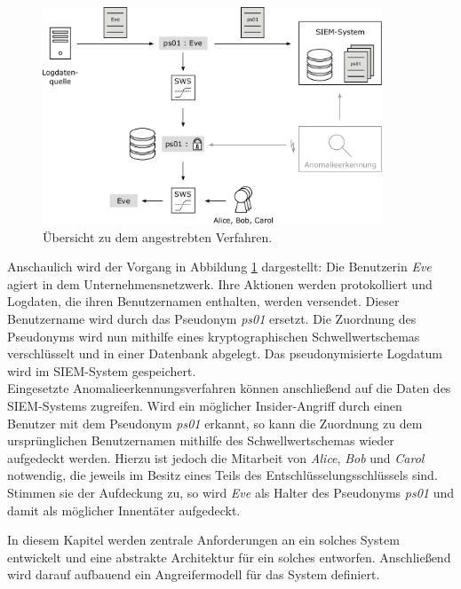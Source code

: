 \begin{figure}[]
    \centering
        \includegraphics[width=0.9\textwidth]{dia/overview.pdf}
    \caption{Übersicht zu dem angestrebten Verfahren.}
    \label{fig:overview_initial}
\end{figure}

Anschaulich wird der Vorgang in Abbildung \ref{fig:overview_initial} dargestellt: Die Benutzerin \textit{Eve} agiert in dem Unternehmensnetzwerk. Ihre Aktionen werden protokolliert und Logdaten, die ihren Benutzernamen enthalten, werden versendet. Dieser Benutzername wird durch das Pseudonym \textit{ps01} ersetzt. Die Zuordnung des Pseudonyms wird nun mithilfe eines kryptographischen Schwellwertschemas verschlüsselt und in einer Datenbank abgelegt. Das pseudonymisierte Logdatum wird im SIEM-System gespeichert.\\
Eingesetzte Anomalieerkennungsverfahren können anschließend auf die Daten des SIEM-Systems zugreifen. Wird ein möglicher Insider-Angriff durch einen Benutzer mit dem Pseudonym \textit{ps01} erkannt, so kann die Zuordnung zu dem ursprünglichen Benutzernamen mithilfe des Schwellwertschemas wieder aufgedeckt werden. Hierzu ist jedoch die Mitarbeit von \textit{Alice}, \textit{Bob} und \textit{Carol} notwendig, die jeweils im Besitz eines Teils des Entschlüsselungsschlüssels sind. Stimmen sie der Aufdeckung zu, so wird \textit{Eve} als Halter des Pseudonyms \textit{ps01} und damit als möglicher Innentäter aufgedeckt.

In diesem Kapitel werden zentrale Anforderungen an ein solches System entwickelt und eine abstrakte Architektur für ein solches entworfen. Anschließend wird darauf aufbauend ein Angreifermodell für das System definiert.





